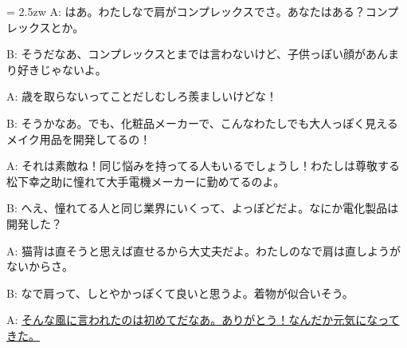\documentclass[11pt]{amsart}
\title{}
\author{}
\newenvironment{hangall}[1]{\hangindent = 2.5zw\everypar{\hangindent = 2.5zw}}{}
\begin{document}
\maketitle
\begin{hangall}{}%
A: はあ。わたしなで肩がコンプレックスでさ。あなたはある？コンプレックスとか。

B: そうだなあ、コンプレックスとまでは言わないけど、子供っぽい顔があんまり好きじゃないよ。

A: 歳を取らないってことだしむしろ羨ましいけどな！

B: そうかなあ。でも、化粧品メーカーで、こんなわたしでも大人っぽく見えるメイク用品を開発してるの！

A: それは素敵ね！同じ悩みを持ってる人もいるでしょうし！わたしは尊敬する松下幸之助に憧れて大手電機メーカーに勤めてるのよ。

B: へえ、憧れてる人と同じ業界にいくって、よっぽどだよ。なにか電化製品は開発した？

A: 猫背は直そうと思えば直せるから大丈夫だよ。わたしのなで肩は直しようがないからさ。

B: なで肩って、しとやかっぽくて良いと思うよ。着物が似合いそう。

A: \ul{そんな風に言われたのは初めてだなあ。ありがとう！なんだか元気になってきた。}\end{hangall}
\end{document}
